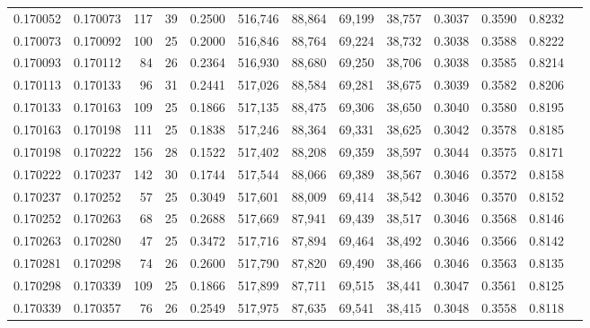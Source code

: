\begin{tabular}{rrrrrrrrrrrrr}
0.170052 & 0.170073 & 117 &  39 &                                     0.2500 & 516,746 &  88,864 &  69,199 &  38,757 & 0.3037 & 0.3590 & 0.8232 \\
0.170073 & 0.170092 & 100 &  25 &                                     0.2000 & 516,846 &  88,764 &  69,224 &  38,732 & 0.3038 & 0.3588 & 0.8222 \\
0.170093 & 0.170112 &  84 &  26 &                                     0.2364 & 516,930 &  88,680 &  69,250 &  38,706 & 0.3038 & 0.3585 & 0.8214 \\
0.170113 & 0.170133 &  96 &  31 &                                     0.2441 & 517,026 &  88,584 &  69,281 &  38,675 & 0.3039 & 0.3582 & 0.8206 \\
0.170133 & 0.170163 & 109 &  25 &                                     0.1866 & 517,135 &  88,475 &  69,306 &  38,650 & 0.3040 & 0.3580 & 0.8195 \\
0.170163 & 0.170198 & 111 &  25 &                                     0.1838 & 517,246 &  88,364 &  69,331 &  38,625 & 0.3042 & 0.3578 & 0.8185 \\
0.170198 & 0.170222 & 156 &  28 &                                     0.1522 & 517,402 &  88,208 &  69,359 &  38,597 & 0.3044 & 0.3575 & 0.8171 \\
0.170222 & 0.170237 & 142 &  30 &                                     0.1744 & 517,544 &  88,066 &  69,389 &  38,567 & 0.3046 & 0.3572 & 0.8158 \\
0.170237 & 0.170252 &  57 &  25 &                                     0.3049 & 517,601 &  88,009 &  69,414 &  38,542 & 0.3046 & 0.3570 & 0.8152 \\
0.170252 & 0.170263 &  68 &  25 &                                     0.2688 & 517,669 &  87,941 &  69,439 &  38,517 & 0.3046 & 0.3568 & 0.8146 \\
0.170263 & 0.170280 &  47 &  25 &                                     0.3472 & 517,716 &  87,894 &  69,464 &  38,492 & 0.3046 & 0.3566 & 0.8142 \\
0.170281 & 0.170298 &  74 &  26 &                                     0.2600 & 517,790 &  87,820 &  69,490 &  38,466 & 0.3046 & 0.3563 & 0.8135 \\
0.170298 & 0.170339 & 109 &  25 &                                     0.1866 & 517,899 &  87,711 &  69,515 &  38,441 & 0.3047 & 0.3561 & 0.8125 \\
0.170339 & 0.170357 &  76 &  26 &                                     0.2549 & 517,975 &  87,635 &  69,541 &  38,415 & 0.3048 & 0.3558 & 0.8118 \\

\end{tabular}
